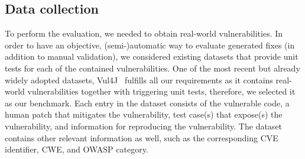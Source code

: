 \subsection{Data collection}

To perform the evaluation, we needed to obtain real-world vulnerabilities.
In order to have an objective, (semi-)automatic way to evaluate generated fixes (in addition to manual validation), we considered existing datasets that provide unit tests for each of the contained vulnerabilities.
One of the most recent but already widely adopted datasets, Vul4J~\cite{vul4j} fulfills all our requirements as it contains real-world vulnerabilities together with triggering unit tests, therefore, we selected it as our benchmark.
%
Each entry in the dataset consists of the vulnerable code, a human patch that mitigates the vulnerability, test case(s) that expose(s) the vulnerability, and information for reproducing the vulnerability.
The dataset contains other relevant information as well, such as the corresponding CVE identifier, CWE, and OWASP category.

